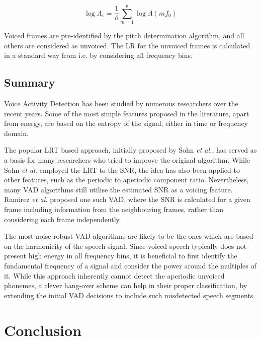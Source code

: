 \begin{equation}
\log \Lambda_v = \frac{1}{\vartheta} \sum_{m=1}^{\vartheta} \log \Lambda(m f_0)
\label{eq:harmfreq}
\end{equation}

Voiced frames are pre-identified by the pitch determination algorithm, and all others are considered as unvoiced. The LR for the unvoiced frames is calculated in a standard way from \cite{SohnInitial} i.e. by considering all frequency bins.

\subsection{Summary}

Voice Activity Detection has been studied by numerous researchers over the recent years. Some of the most simple features proposed in the literature, apart from energy, are based on the entropy of the signal, either in time or frequency domain.

The popular LRT based approach, initially proposed by Sohn \emph{et al.}, has served as a basis for many researchers who tried to improve the original algorithm. While Sohn \emph{et al.} employed the LRT to the SNR, the idea has also been applied to other features, such as the periodic to aperiodic component ratio. Nevertheless, many VAD algorithms still utilise the estimated SNR as a voicing feature. Ramirez \emph{et al.} proposed one such VAD, where the SNR is calculated for a given frame including information from the neighbouring frames, rather than considering each frame independently.

The most noise-robust VAD algorithms are likely to be the ones which are based on the harmonicity of the speech signal. Since voiced speech typically does not present high energy in all frequency bins, it is beneficial to first identify the fundamental frequency of a signal and consider the power around the multiples of it. While this approach inherently cannot detect the aperiodic unvoiced phonemes, a clever hang-over scheme can help in their proper classification, by extending the initial VAD decisions to include such misdetected speech segments.


\section{Conclusion}

